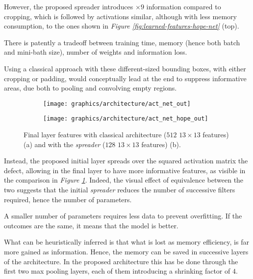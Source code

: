         \par{
            However, the proposed spreader introduces $\times 9$ information compared to cropping, which is followed by activations similar, although with less memory consumption, to the ones shown in \emph{Figure \ref{fig:learned-features-hope-net}} (top).
        }
        \par{
            There is patently a tradeoff between training time, memory (hence both batch and mini-bath size), number of weights and information loss.
        }
        \par{
            Using a classical approach with these different-sized bounding boxes, with either cropping or padding, would conceptually lead at the end to suppress informative areas, due both to pooling and convolving empty regions.
        }
        \begin{figure}
            \centering
            \begin{subfigure}{.5\linewidth}
                \centering
                \texttt{[image: graphics/architecture/act\_net\_out]}
            \end{subfigure}\hfill
            \begin{subfigure}{.5\linewidth}
                \centering
                \texttt{[image: graphics/architecture/act\_net\_hope\_out]}
            \end{subfigure}
            \caption{Final layer features with classical architecture ($512$ $13\times 13$ features) (a) and with the \emph{spreader} ($128$ $13\times 13$ features) (b).}
            \label{fig:features-last-layer}
        \end{figure}
        \par{
            Instead, the proposed initial layer spreads over the squared activation matrix the defect, allowing in the final layer to have more informative features, as visible in the comparison in \emph{Figure \ref{fig:features-last-layer}}. Indeed, the visual effect of equivalence between the two suggests that the initial \emph{spreader} reduces the number of successive filters required, hence the number of parameters. 
        }
        \par{
            A smaller number of parameters requires less data to prevent overfitting. If the outcomes are the same, it means that the model is better.
        }
        \par{
            What can be heuristically inferred is that what is lost as memory efficiency, is far more gained as information. Hence, the memory can be saved in successive layers of the architecture. In the proposed architecture this has be done through the first two max pooling layers, each of them introducing a shrinking factor of $4$.
        }

